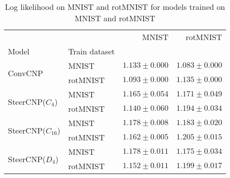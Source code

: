 \begin{table}
\centering
\caption{Log likelihood on MNIST and rotMNIST for models trained on MNIST and rotMNIST}
\label{tab:mnist_tests}
\begin{tabular}{llrr}
\toprule
                &          &                       MNIST &                    rotMNIST \\
Model & Train dataset &                             &                             \\
\midrule
\multirow{2}{*}{ConvCNP} & MNIST &         ${1.133 \pm 0.000}$ &         ${1.083 \pm 0.000}$ \\
                & rotMNIST &         ${1.093 \pm 0.000}$ &         ${1.135 \pm 0.000}$ \\
\cline{1-4}
\multirow{2}{*}{SteerCNP($C_4$)} & MNIST &  $\mathbf{1.165 \pm 0.054}$ &         ${1.171 \pm 0.049}$ \\
                & rotMNIST &         ${1.140 \pm 0.060}$ &  $\mathbf{1.194 \pm 0.034}$ \\
\cline{1-4}
\multirow{2}{*}{SteerCNP($C_{16}$)} & MNIST &  $\mathbf{1.178 \pm 0.008}$ &         ${1.183 \pm 0.020}$ \\
                & rotMNIST &         ${1.162 \pm 0.005}$ &  $\mathbf{1.205 \pm 0.015}$ \\
\cline{1-4}
\multirow{2}{*}{SteerCNP($D_4$)} & MNIST &  $\mathbf{1.178 \pm 0.011}$ &         ${1.175 \pm 0.034}$ \\
                & rotMNIST &         ${1.152 \pm 0.011}$ &  $\mathbf{1.199 \pm 0.017}$ \\
\bottomrule
\end{tabular}
\end{table}
